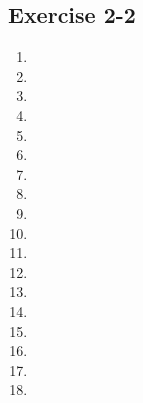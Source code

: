 
\subsection{Exercise 2-2} %
\begin{multicols}{2}
\begin{enumerate}[itemsep=5pt, label=\textbf{\arabic*}. ] 
\item %
\item %
\item %
\item %
\item %
\item %
\item %
\item %
\item %
\item %
\item %
\item %
\item %
\item %
\item %
\item %
\item %
\item %
\end{enumerate}
\end{multicols}


